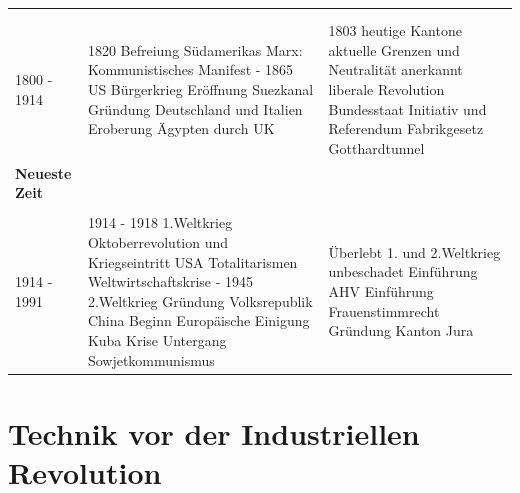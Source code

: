 \documentclass[10pt, openright=true]{scrartcl}
\begin{document}
\begin{tabularx}{1\textwidth}{L{3cm} L{6cm} X}
 \\
\\
1800 - 1914 & 1820 Befreiung Südamerikas  Marx: Kommunistisches Manifest  - 1865 US Bürgerkrieg  Eröffnung Suezkanal  Gründung Deutschland und Italien  Eroberung Ägypten durch UK & 1803 heutige Kantone  aktuelle Grenzen und Neutralität anerkannt  liberale Revolution  Bundesstaat  Initiativ und Referendum  Fabrikgesetz  Gotthardtunnel \newline\\
 \textbf{Neueste Zeit} & &\\
\\
1914 - 1991 & 1914 - 1918 1.Weltkrieg  Oktoberrevolution und Kriegseintritt USA  Totalitarismen  Weltwirtschaftskrise  - 1945 2.Weltkrieg  Gründung Volksrepublik China  Beginn Europäische Einigung  Kuba Krise  Untergang Sowjetkommunismus & Überlebt 1. und 2.Weltkrieg unbeschadet  Einführung AHV  Einführung Frauenstimmrecht  Gründung Kanton Jura \\
\end{tabularx}
\section{Technik vor der Industriellen Revolution}
\end{document}

